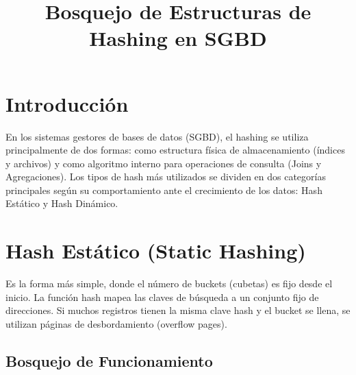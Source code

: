 \documentclass{article}
\title{Bosquejo de Estructuras de Hashing en SGBD}
\author{}
\date{}
\begin{document}
\maketitle

\section{Introducción}
En los sistemas gestores de bases de datos (SGBD), el hashing se utiliza principalmente de dos formas: como estructura física de almacenamiento (índices y archivos) y como algoritmo interno para operaciones de consulta (Joins y Agregaciones). 
Los tipos de hash más utilizados se dividen en dos categorías principales según su comportamiento ante el crecimiento de los datos: Hash Estático y Hash Dinámico.

\section{Hash Estático (Static Hashing)}
Es la forma más simple, donde el número de buckets (cubetas) es fijo desde el inicio. La función hash mapea las claves de búsqueda a un conjunto fijo de direcciones. Si muchos registros tienen la misma clave hash y el bucket se llena, se utilizan páginas de desbordamiento (overflow pages).

\subsection*{Bosquejo de Funcionamiento}
\begin{center}
\end{center}
\end{document}
